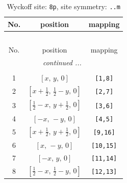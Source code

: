 \documentclass[fleqn,8pt]{jsarticle}
\begin{document}
\begin{longtable}{ccc}
\caption{Wyckoff site: {\tt 8p}, site symmetry: {\tt ..m}}
 \\
 \hline \hline
No. & position & mapping \\ \hline \endfirsthead

\multicolumn{2}{l}{\tablename\ \thetable{}} \\
 \hline \hline
No. & position & mapping \\ \hline \endhead

 \hline \hline
\multicolumn{2}{r}{\footnotesize\it continued ...} \\ \endfoot

 \hline \hline
\multicolumn{2}{r}{} \\ \endlastfoot

1 & $\left[ x,\, y,\, 0 \right]$ & {\tt [1,8]} \\ \hline
2 & $\left[ x + \frac{1}{2},\, \frac{1}{2} - y,\, 0 \right]$ & {\tt [2,7]} \\ \hline
3 & $\left[ \frac{1}{2} - x,\, y + \frac{1}{2},\, 0 \right]$ & {\tt [3,6]} \\ \hline
4 & $\left[ - x,\, - y,\, 0 \right]$ & {\tt [4,5]} \\ \hline
5 & $\left[ x + \frac{1}{2},\, y + \frac{1}{2},\, 0 \right]$ & {\tt [9,16]} \\ \hline
6 & $\left[ x,\, - y,\, 0 \right]$ & {\tt [10,15]} \\ \hline
7 & $\left[ - x,\, y,\, 0 \right]$ & {\tt [11,14]} \\ \hline
8 & $\left[ \frac{1}{2} - x,\, \frac{1}{2} - y,\, 0 \right]$ & {\tt [12,13]} \\
\end{longtable}
\renewcommand{\arraystretch}{1.2}
\end{document}
